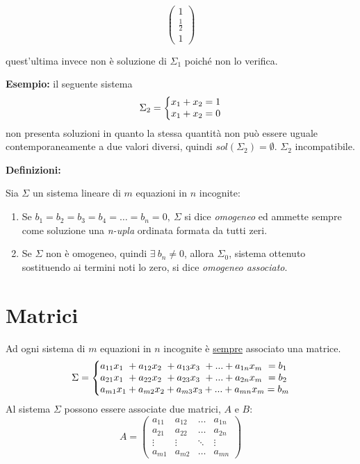 \documentclass[a4paper]{article}
\makeatletter
\newenvironment{sistema}%
{\left\lbrace\begin{array}{{@{}l@{}l@{}l@{}l@{}}}}%
	{\end{array}\right.}
\newcommand{\n}{\par \noindent \newline}
\newcommand{\ns}{\par \noindent}
\makeatother
\begin{document}
\begin{equation*}
	\begin{pmatrix}
		1 \\
		\frac{1}{2} \\
		1
	\end{pmatrix}
\end{equation*}
\begin{center}
	quest'ultima invece non è soluzione di $\Sigma_1$ poiché non lo verifica.
\end{center}
\textbf{Esempio: }il seguente sistema
\begin{equation*}
	\Sigma_2 = 
	\begin{sistema}
		x_1 + x_2 = 1 \\
		x_1 + x_2 = 0
	\end{sistema}
\end{equation*}
non presenta soluzioni in quanto la stessa quantità non può essere uguale contemporaneamente a due valori diversi, quindi $sol(\Sigma_2)=\emptyset$. $\Sigma_2$ incompatibile.
\n
\textbf{Definizioni: }
\ns
Sia $\Sigma$ un sistema lineare di $m$ equazioni in $n$ incognite:
\begin{enumerate}
	\item Se $b_1 = b_2 = b_3 = b_4 = \dots = b_n = 0, \ \Sigma$ si dice \textit{omogeneo} ed ammette sempre come soluzione una \textit{n-upla} ordinata formata da tutti zeri.
	\item Se $\Sigma$ non è omogeneo, quindi $\exists \ b_n \neq 0$, allora $\Sigma_0$, sistema ottenuto sostituendo ai termini noti lo zero, si dice \textit{omogeneo associato}.
\end{enumerate}
\section{Matrici}
Ad ogni sistema di $m$ equazioni in $n$ incognite è \underline{sempre} associato una matrice.
\begin{equation*}
	\Sigma = {
		\begin{sistema}
			a_{11} x_1 \ + a_{12} x_2\  + a_{13} x_3 \ + ...  + a_{1n} x_m \  = b_1 \\
			a_{21} x_1 \ + a_{22} x_2 \ + a_{23} x_3 \ + ... + a_{2n} x_m \  = b_2 \\
			a_{m1} x_1  + a_{m2} x_2 + a_{m3} x_3 + ... + a_{mn} x_m  = b_m
			
		\end{sistema}
	}
\end{equation*}
Al sistema $\Sigma$ possono essere associate due matrici, $A$ e $B$:
\begin{equation*}
	A= 
	\begin{pmatrix}
		a_{11} & a_{12} & \dots&  a_{1n} \\
		a_{21} & a_{22} & \dots&  a_{2n} \\
		\vdots & \vdots & \ddots & \vdots \\
		a_{m1} & a_{m2} & \dots&  a_{mn}
		
	\end{pmatrix}
\end{equation*}
\end{document}
